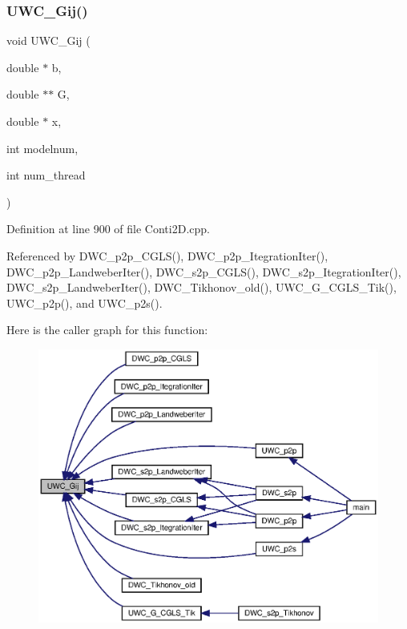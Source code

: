 \subsubsection{U\+W\+C\+\_\+\+Gij()\hspace{0.1cm}{\footnotesize\ttfamily [1/2]}}
{\footnotesize\ttfamily void U\+W\+C\+\_\+\+Gij (\begin{DoxyParamCaption}\item[{double $\ast$}]{b,  }\item[{double $\ast$$\ast$}]{G,  }\item[{double $\ast$}]{x,  }\item[{int}]{modelnum,  }\item[{int}]{num\+\_\+thread }\end{DoxyParamCaption})}



Definition at line 900 of file Conti2\+D.\+cpp.



Referenced by D\+W\+C\+\_\+p2p\+\_\+\+C\+G\+L\+S(), D\+W\+C\+\_\+p2p\+\_\+\+Itegration\+Iter(), D\+W\+C\+\_\+p2p\+\_\+\+Landweber\+Iter(), D\+W\+C\+\_\+s2p\+\_\+\+C\+G\+L\+S(), D\+W\+C\+\_\+s2p\+\_\+\+Itegration\+Iter(), D\+W\+C\+\_\+s2p\+\_\+\+Landweber\+Iter(), D\+W\+C\+\_\+\+Tikhonov\+\_\+old(), U\+W\+C\+\_\+\+G\+\_\+\+C\+G\+L\+S\+\_\+\+Tik(), U\+W\+C\+\_\+p2p(), and U\+W\+C\+\_\+p2s().

Here is the caller graph for this function\+:\nopagebreak
\begin{figure}[H]
\begin{center}
\leavevmode
\includegraphics[width=350pt]{Conti2D_8cpp_a632c1e4efbb7e9b1aaf04db729e69394_a632c1e4efbb7e9b1aaf04db729e69394_icgraph}
\end{center}
\end{figure}
\mbox{\label{Conti2D_8cpp_a0cc3e78b4faaa9da0728fdc85057425d_a0cc3e78b4faaa9da0728fdc85057425d}} 
